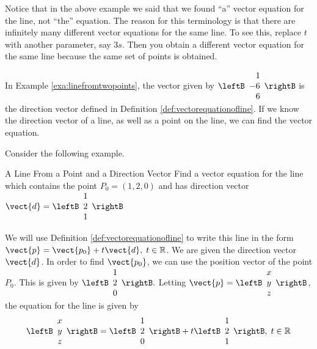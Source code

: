Notice that in the above example we said that we found ``a'' vector
equation for the line, not ``the'' equation.  The reason for this
terminology is that there are infinitely many different vector 
equations for the same line. To see this, replace $t$ with another
parameter, say $3s.$ Then you obtain a different vector equation for the same
line because the same set of points is obtained.

In Example \ref{exa:linefromtwopoints}, the vector given by 
$\leftB
\begin{array}{r}
 1 \\
-6 \\
6 
\end{array}
\rightB$
is the direction vector defined in Definition \ref{def:vectorequationofline}.
If we know the direction vector of a line, as well as a point on the line,
we can find the vector equation. 

Consider the following example. 

\begin{example}{A Line From a Point and a Direction Vector}\label{exa:linepointanddirectionvector}
Find a vector equation for the line which contains the point $P_0 = \left(
1,2,0\right) $ and has direction vector $\vect{d} = 
\leftB
\begin{array}{c}
1 \\
2 \\
1
\end{array}
\rightB
$
\end{example}

\begin{solution}
We will use Definition \ref{def:vectorequationofline} to write this line in the form 
$\vect{p}=\vect{p_0}+t\vect{d},\; t\in \mathbb{R}$. We are given the direction vector $\vect{d}$. 
In order to find $\vect{p_0}$, we can use the position vector of the point $P_0$. 
This is given by 
$\leftB
\begin{array}{c}
1 \\
2 \\
0
\end{array}
\rightB.
$
Letting $\vect{p}
=
\leftB
\begin{array}{c}
 x \\
y \\
z
\end{array}
\rightB
$,
the equation for the line is given by 
\begin{equation}
\leftB
\begin{array}{c}
x \\
y \\
z
\end{array}
\rightB
=
\leftB
\begin{array}{c}
1 \\
2 \\
0
\end{array}
\rightB
+ 
t
\leftB
\begin{array}{c}
1 \\
2 \\
1
\end{array}
\rightB,
\;t\in
\mathbb{R} \label{vectoreqn}
\end{equation}
\end{solution}

